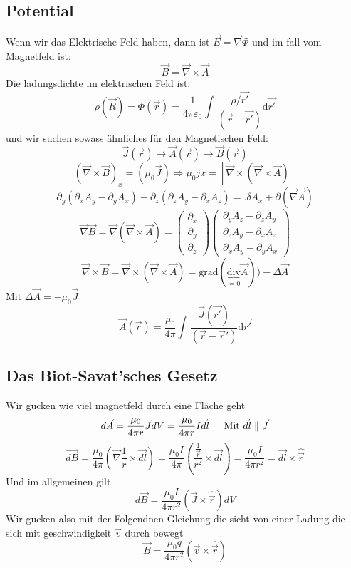 \documentclass{article}
\newcommand{\mspc}{\hspace{0.4cm}}
\begin{document}
\subsection*{Potential} Wenn wir das Elektrische Feld haben, dann ist $\vec{E}=\vec{\nabla}\Phi$ und im fall vom Magnetfeld ist:
\[\vec{B}=\vec{\nabla}\times \vec{A}\]
Die ladungsdichte im elektrischen Feld ist:
\[\rho(\vec{R})=\Phi(\vec{r})=\frac{1}{4\pi\varepsilon_0}\int^{}_{}\frac{\rho/\vec{r'}}{(\vec{r}-\vec{r'})}\text{d}\vec{r'}\]
und wir suchen sowass ähnliches für den Magnetischen Feld:
\[\vec{J}(\vec{r})\rightarrow \vec{A}(\vec{r})\rightarrow \vec{B}(\vec{r})\]
\[(\vec{\nabla}\times \vec{B})_x=(\mu_0 \vec{J})\Rightarrow \mu_0 jx=\left[\vec{\nabla}\times (\vec{\nabla} \times\vec{A})\right]\]
\[\partial_y(\partial_xA_y-\partial_y A_x)-\partial_z(\partial_zA_y-\partial_xA_z)=.\delta A_x+\partial(\vec{\nabla} \vec{A})\]
\[\vec{\nabla}\vec{B}=\vec{\nabla}(\vec{\nabla}\times \vec{A})=\begin{pmatrix}\partial_x\\\partial_y\\\partial_z\end{pmatrix}\begin{pmatrix}\partial_yA_z-\partial_zA_y\\\partial_zA_y-\partial_xA_z\\\partial_x A_y-\partial_y A_x\end{pmatrix}\]
\[\vec{\nabla}\times \vec{B}=\vec{\nabla}\times(\vec{\nabla}\times \vec{A})=\text{grad}(\underset{=0}{\underbrace{\text{div}}}\vec{A}))-\Delta \vec{A}\]
Mit $\Delta \vec{A}=-\mu_0 \vec{J}$
\[\vec{A}(\vec{r})=\frac{\mu_0}{4\pi}\int^{}_{}\frac{\vec{J}(\vec{r'})}{(\vec{r}-\vec{r}')}\text{d}\vec{r'}\]
\subsection*{Das Biot-Savat'sches Gesetz}
Wir gucken wie viel magnetfeld durch eine Fläche geht
\[d \vec{A}=\frac{\mu_0}{4\pi r}\vec{J}dV=\frac{\mu_0}{4\pi r}I \vec{dl}\mspc \text{ Mit } \vec{dl}\parallel \vec{J}\]
\[\vec{dB}=\frac{\mu_0}{4\pi}\left(\vec{\nabla}\frac{1}{r}\times \vec{dl}\right)=\frac{\mu_0 I }{4\pi}\left(\frac{\frac{1}{\vec{r}}}{r^2}\times \vec{dl}\right)=\frac{\mu_0 I }{4\pi r^2}=\vec{dl}\times \hat{\vec{r}}\]
Und im allgemeinen gilt 
\[d \vec{B}=\frac{\mu_0 I }{4\pi r^2}(\vec{J}\times\hat{\vec{r}})dV\]
Wir gucken also mit der Folgendnen Gleichung die sicht von einer Ladung die sich mit geschwindigkeit $\vec{v}$ durch bewegt
\[\vec{B}=\frac{\mu_0 q}{4\pi r^2}(\vec{v}\times \hat{\vec{r}})\]
\end{document}
